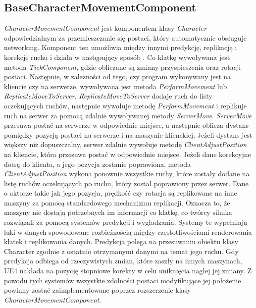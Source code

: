 \documentclass[multip]{SGGW-thesis}
\begin{document}
	\subsection{BaseCharacterMovementComponent}
	{\em CharacterMovementComponent} jest komponentem klasy {\em Character} odpowiedzialnym za przemieszczanie się postaci, który automatycznie obsługuje networking. Komponent ten umożliwia między innymi predykcję, replikację i korekcję ruchu i działa w następujący sposób \cite{docs-charactermovementcomponent}. Co klatkę wywoływana jest metoda {\em TickComponent}, gdzie obliczane są zmiany przyspieszenia oraz rotacji postaci. Następnie, w zależności od tego, czy program wykonywany jest na kliencie czy na serwerze, wywoływana jest metoda {\em PerformMovement} lub {\em ReplicateMoveToServer}. {\em ReplicateMoveToServer} dodaje ruch do listy oczekujących ruchów, następnie wywołuje metodę {\em PerformMovement} i replikuje ruch na serwer za pomocą zdalnie wywoływanej metody {\em ServerMove}. {\em ServerMove} przesuwa postać na serwerze w odpowiednie miejsce, a następnie oblicza dystans pomiędzy pozycją postaci na serwerze i na maszynie klienckiej. Jeżeli dystans jest większy niż dopuszczalny, serwer zdalnie wywołuje metodę {\em ClientAdjustPosition} na kliencie, która przesuwa postać w odpowiednie miejsce. Jeżeli dane korekcyjne dotrą do klienta, a jego pozycja zostanie poprawiona, metoda {\em ClientAdjustPosition} wykona ponownie wszystkie ruchy, które zostały dodane na listę ruchów oczekujących po ruchu, który został poprawiony przez serwer.
\newline \indent Dane o aktorze takie jak jego pozycja, prędkość czy rotacja są replikowane na inne maszyny za pomocą standardowego mechanizmu replikacji. Oznacza to, że maszyny nie dostają potrzebnych im informacji co klatkę, co twórcy silnika rozwiązali za pomocą systemów predykcji i wygładzania. Systemy te wypełniają luki w danych spowodowane rozbieżnością między częstotliwościami renderowania klatek i replikowania danych. Predykcja polega na przesuwaniu obiektu klasy Character zgodnie z ostatnio otrzymanymi danymi na temat jego ruchu. Gdy predykcja odbiega od rzeczywistych zmian, które zaszły na innych maszynach, UE4 nakłada na pozycję stopniowe korekty w celu uniknięcia nagłej jej zmiany.
\newline \indent Z powodu tych systemów wszystkie zdolności postaci modyfikujące jej położenie powinny zostać zaimplementowane poprzez rozszerzenie klasy {\em CharacterMovementComponent}.
\end{document}

